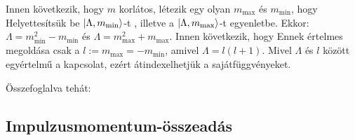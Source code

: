    Innen következik, hogy $m$ korlátos, létezik egy olyan $m_\text{max}$ és $m_\text{min}$, hogy 
   Helyettesítsük be $\lvert\Lambda,m_\text{min}\rangle$-t , illetve a $\lvert\Lambda,m_\text{max}\rangle$-t  egyenletbe. Ekkor: $\Lambda=m_\text{min}^2-m_\text{min}$ és $\Lambda=m_\text{max}^2+m_\text{max}$. Innen következik, hogy 
   Ennek értelmes megoldása csak a $l:=m_\text{max}=-m_\text{min}$, amivel $\Lambda=l(l+1)$. Mivel $\Lambda$ és $l$ között egyértelmű a kapcsolat, ezért átindexelhetjük a sajátfüggvényeket.
   
   Összefoglalva tehát:
   \\[6pt]
   
  \subsection{Impulzusmomentum-összeadás}
   
